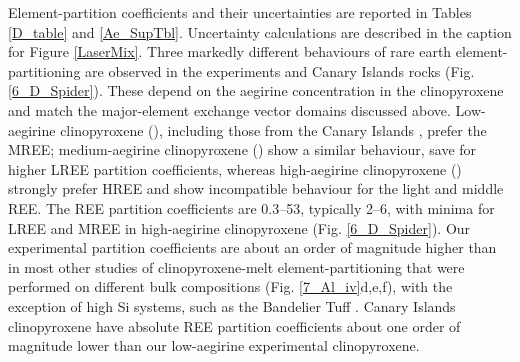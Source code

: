 \documentclass[review,authoryear,12pt]{elsarticle}
\begin{document}
Element-partition coefficients and their uncertainties
 are reported in Tables \ref{D_table} and \ref{Ae_SupTbl}. Uncertainty calculations are described in the caption for Figure \ref{LaserMix}.
 Three markedly different behaviours of rare earth element-partitioning are observed in the experiments and Canary Islands rocks (Fig. \ref{6_D_Spider}). These depend on the aegirine concentration in the clinopyroxene and match the major-element exchange vector domains discussed above. Low-aegirine clinopyroxene (), including those from the Canary Islands
 , prefer the MREE; medium-aegirine clinopyroxene () show a similar behaviour, save for higher LREE partition coefficients, whereas high-aegirine clinopyroxene () strongly prefer HREE and show incompatible behaviour for the light and middle REE. The REE partition coefficients are 0.3--53, typically 2--6, with minima for LREE and MREE in high-aegirine clinopyroxene (Fig. \ref{6_D_Spider}). Our experimental partition coefficients are about an order of magnitude higher than in most other studies of clinopyroxene-melt element-partitioning that were performed on different bulk compositions (Fig. \ref{7_Al_iv}d,e,f), with the exception of high Si systems, such as the Bandelier Tuff \citep[cf.][]{Olin2010}.
  Canary Islands clinopyroxene have absolute REE partition coefficients about one order of magnitude lower than our low-aegirine experimental clinopyroxene.
\end{document}
